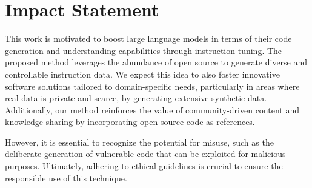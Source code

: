 \section*{Impact Statement}
This work is motivated to boost large language models in terms of their code generation and understanding capabilities through instruction tuning.
The proposed \tech{} method leverages the abundance of open source to generate diverse and controllable instruction data.
We expect this idea to also foster innovative software solutions tailored to domain-specific needs, particularly in areas where real data is private and scarce, by generating extensive synthetic data.
Additionally, our method reinforces the value of community-driven content and knowledge sharing by incorporating open-source code as references.

However, it is essential to recognize the potential for misuse, such as the deliberate generation of vulnerable code that can be exploited for malicious purposes.
Ultimately, adhering to ethical guidelines is crucial to ensure the responsible use of this technique.

\newpage

